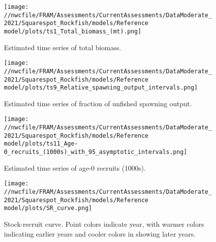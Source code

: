 \documentclass[11pt,
  english,
  a4paper,
]{article}
\begin{document}
\tagmcend\tagstructend


\begin{figure}
\centering
\texttt{[image: //nwcfile/FRAM/Assessments/CurrentAssessments/DataModerate\_2021/Squarespot\_Rockfish/models/Reference model/plots/ts1\_Total\_biomass\_(mt).png]}
\caption{Estimated time series of total biomass.\label{fig:tot-bio}}
\end{figure}

\tagmcend\tagstructend


\begin{figure}
\centering
\texttt{[image: //nwcfile/FRAM/Assessments/CurrentAssessments/DataModerate\_2021/Squarespot\_Rockfish/models/Reference model/plots/ts9\_Relative\_spawning\_output\_intervals.png]}
\caption{Estimated time series of fraction of unfished spawning output.\label{fig:depl}}
\end{figure}

\tagmcend\tagstructend


\begin{figure}
\centering
\texttt{[image: //nwcfile/FRAM/Assessments/CurrentAssessments/DataModerate\_2021/Squarespot\_Rockfish/models/Reference model/plots/ts11\_Age-0\_recruits\_(1000s)\_with\_95\_asymptotic\_intervals.png]}
\caption{Estimated time series of age-0 recruits (1000s).\label{fig:recruits}}
\end{figure}

\tagmcend\tagstructend


\begin{figure}
\centering
\texttt{[image: //nwcfile/FRAM/Assessments/CurrentAssessments/DataModerate\_2021/Squarespot\_Rockfish/models/Reference model/plots/SR\_curve.png]}
\caption{Stock-recruit curve. Point colors indicate year, with warmer colors indicating earlier years and cooler colors in showing later years.\label{fig:bh-curve}}
\end{figure}
\end{document}
